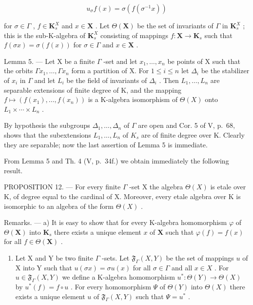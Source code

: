 \[
u _ {\sigma} f (x) = \sigma \left(f \left(\sigma^ {- 1} x\right)\right)\tag{12}
\]

for \(\sigma \in \Gamma\) , \(f \in \mathbf{K}_s^X\) and \(x \in \mathbf{X}\) . Let \(\Theta(\mathbf{X})\) be the set of invariants of \(\Gamma\) in \(\mathbf{K}_s^X\) ; this is the sub-K-algebra of \(\mathbf{K}_s^X\) consisting of mappings \(f: \mathbf{X} \to \mathbf{K}_s\) such that \(f(\sigma x) = \sigma(f(x))\) for \(\sigma \in \Gamma\) and \(x \in \mathbf{X}\) .

Lemma 5. --- Let X be a finite \(\Gamma\) -set and let \(x_1, \ldots, x_n\) be points of X such that the orbits \(\Gamma x_1, \ldots, \Gamma x_n\) form a partition of X. For \(1 \leqslant i \leqslant n\) let \(\Delta_i\) be the stabilizer of \(x_i\) in \(\Gamma\) and let \(L_i\) be the field of invariants of \(\Delta_i\) . Then \(L_1, \ldots, L_n\) are separable extensions of finite degree of K, and the mapping \(f \mapsto (f(x_1), \ldots, f(x_n))\) is a K-algebra isomorphism of \(\Theta(X)\) onto \(L_1 \times \cdots \times L_n\) .

By hypothesis the subgroups \(\Delta_{1},\ldots,\Delta_{n}\) of \(\Gamma\) are open and Cor. 5 of V, p.~68, shows that the subextensions \(L_{1},\ldots,L_{n}\) of \(K_{s}\) are of finite degree over K. Clearly they are separable; now the last assertion of Lemma 5 is immediate.

From Lemma 5 and Th. 4 (V, p.~34f.) we obtain immediately the following result.

PROPOSITION 12. --- For every finite \(\Gamma\) -set X the algebra \(\Theta(X)\) is etale over K, of degree equal to the cardinal of X. Moreover, every etale algebra over K is isomorphic to an algebra of the form \(\Theta(X)\) .

Remarks. --- a) It is easy to show that for every K-algebra homomorphism \(\varphi\) of \(\Theta(\mathbf{X})\) into \(\mathbf{K}_s\) there exists a unique element \(x\) of \(\mathbf{X}\) such that \(\varphi(f) = f(x)\) for all \(f \in \Theta(\mathbf{X})\) .

\begin{enumerate}
\def\labelenumi{\arabic{enumi})}
\setcounter{enumi}{1}
\tightlist
\item
  Let X and Y be two finite \(\Gamma\) -sets. Let \(\mathfrak{F}_{\Gamma}(X, Y)\) be the set of mappings \(u\) of X into Y such that \(u(\sigma x) = \sigma u(x)\) for all \(\sigma \in \Gamma\) and all \(x \in X\) . For \(u \in \mathfrak{F}_{\Gamma}(X, Y)\) we define a K-algebra homomorphism \(u^{*}: \Theta(Y) \to \Theta(X)\) by \(u^{*}(f) = f \circ u\) . For every homomorphism \(\Psi\) of \(\Theta(Y)\) into \(\Theta(X)\) there exists a unique element \(u\) of \(\mathfrak{F}_{\Gamma}(X, Y)\) such that \(\Psi = u^{*}\) .
\end{enumerate}

